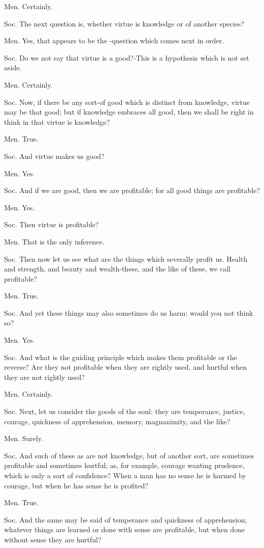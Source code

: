 Men. Certainly. 

Soc. The next question is, whether virtue is knowledge or of another
species? 

Men. Yes, that appears to be the -question which comes next in order.

Soc. Do we not say that virtue is a good?-This is a hypothesis which
is not set aside. 

Men. Certainly. 

Soc. Now, if there be any sort-of good which is distinct from knowledge,
virtue may be that good; but if knowledge embraces all good, then
we shall be right in think in that virtue is knowledge? 

Men. True. 

Soc. And virtue makes us good? 

Men. Yes. 

Soc. And if we are good, then we are profitable; for all good things
are profitable? 

Men. Yes. 

Soc. Then virtue is profitable? 

Men. That is the only inference. 

Soc. Then now let us see what are the things which severally profit
us. Health and strength, and beauty and wealth-these, and the like
of these, we call profitable? 

Men. True. 

Soc. And yet these things may also sometimes do us harm: would you
not think so? 

Men. Yes. 

Soc. And what is the guiding principle which makes them profitable
or the reverse? Are they not profitable when they are rightly used,
and hurtful when they are not rightly used? 

Men. Certainly. 

Soc. Next, let us consider the goods of the soul: they are temperance,
justice, courage, quickness of apprehension, memory, magnanimity,
and the like? 

Men. Surely. 

Soc. And such of these as are not knowledge, but of another sort,
are sometimes profitable and sometimes hurtful; as, for example, courage
wanting prudence, which is only a sort of confidence? When a man has
no sense he is harmed by courage, but when he has sense he is profited?

Men. True. 

Soc. And the same may be said of temperance and quickness of apprehension;
whatever things are learned or done with sense are profitable, but
when done without sense they are hurtful? 

